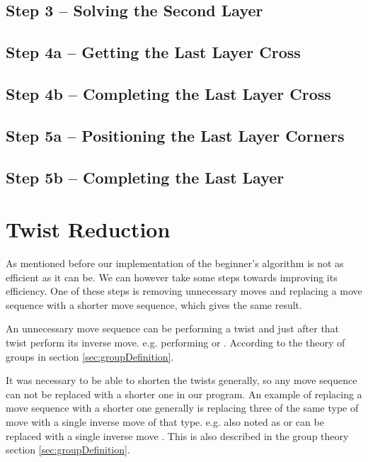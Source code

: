 \subsection{Step 3 -- Solving the Second Layer}

\subsection{Step 4a --  Getting the Last Layer Cross}

\subsection{Step 4b -- Completing the Last Layer Cross}

\subsection{Step 5a -- Positioning the Last Layer Corners}

\subsection{Step 5b -- Completing the Last Layer}


\section{Twist Reduction}
As mentioned before our implementation of the beginner's algorithm is not as efficient as it can be. We can however take some steps towards improving its efficiency. One of these steps is removing unnecessary moves and replacing a move sequence with a shorter move sequence, which gives the same result.

An unnecessary move sequence can be performing a twist and just after that twist perform its inverse move. e.g. performing  or .
According to the theory of groups in section \ref{sec:groupDefinition}.

It was necessary to be able to shorten the twists generally, so any move sequence can not be replaced with a shorter one in our program.
An example of replacing a move sequence with a shorter one generally is replacing three of the same type of move with a single inverse move of that type. e.g.  also noted as  or  can be replaced with a single inverse move . This is also described in the group theory section \ref{sec:groupDefinition}.



